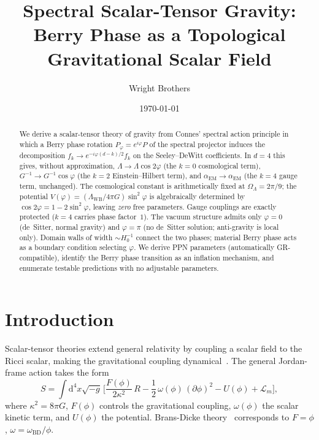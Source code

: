 \documentclass[aps,prd,twocolumn,superscriptaddress,nofootinbib]{revtex4-2}
\newcommand{\dd}{\mathrm{d}}
\newcommand{\Lw}{\Lambda_{\mathrm{WB}}}
\begin{document}
\title{Spectral Scalar-Tensor Gravity:\\
Berry Phase as a Topological Gravitational Scalar Field}

\author{Wright Brothers}
\date{\today}

\begin{abstract}
We derive a scalar-tensor theory of gravity from Connes' spectral
action principle in which a Berry phase rotation
$P_\varphi = e^{i\varphi}P$ of the spectral projector induces
the decomposition $f_k \to e^{-i\varphi(d-k)/2}f_k$ on the
Seeley--DeWitt coefficients.  In $d=4$ this gives, without
approximation, $\Lambda \to \Lambda\cos 2\varphi$ (the $k=0$
cosmological term), $G^{-1}\to G^{-1}\cos\varphi$ (the $k=2$
Einstein--Hilbert term), and $\alpha_{\mathrm{EM}}\to
\alpha_{\mathrm{EM}}$ (the $k=4$ gauge term, unchanged).
The cosmological constant is arithmetically fixed at
$\Omega_\Lambda = 2\pi/9$; the potential
$V(\varphi)=(\Lw/4\pi G)\sin^2\varphi$ is algebraically
determined by $\cos 2\varphi = 1-2\sin^2\varphi$, leaving
\emph{zero} free parameters.  Gauge couplings are exactly
protected ($k=4$ carries phase factor~$1$).
The vacuum structure admits only $\varphi=0$ (de~Sitter,
normal gravity) and $\varphi=\pi$ (no de~Sitter solution;
anti-gravity is local only).  Domain walls of width
$\sim H_0^{-1}$ connect the two phases; material Berry phase
acts as a boundary condition selecting $\varphi$.
We derive PPN parameters (automatically GR-compatible),
identify the Berry phase transition as an inflation mechanism,
and enumerate testable predictions with no adjustable parameters.
\end{abstract}

\maketitle

\section{Introduction}

Scalar-tensor theories extend general relativity by coupling
a scalar field to the Ricci scalar, making the gravitational
coupling dynamical~\cite{BransDicke1961, Fujii2003}.
The general Jordan-frame action takes the form
\begin{equation}
  S = \int \dd^4 x \sqrt{-g}\,
  \biggl[\frac{F(\phi)}{2\kappa^2}\,R
  - \frac{1}{2}\,\omega(\phi)\,(\partial\phi)^2
  - U(\phi) + \mathcal{L}_m\biggr],
  \label{eq:general_ST}
\end{equation}
where $\kappa^2 = 8\pi G$, $F(\phi)$ controls the gravitational
coupling, $\omega(\phi)$ the scalar kinetic term, and $U(\phi)$ the
potential. Brans-Dicke theory~\cite{BransDicke1961} corresponds to
$F = \phi$, $\omega = \omega_{\mathrm{BD}}/\phi$.
\end{document}
